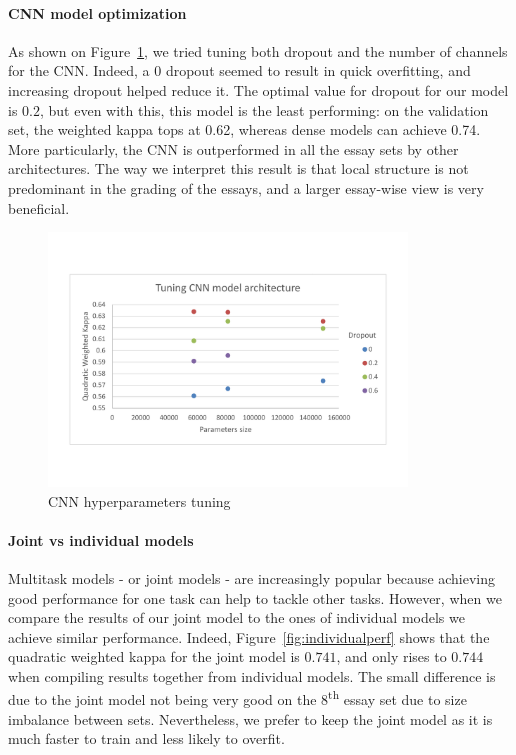 \documentclass[a4paper,12pt,english]{article}
\begin{document}
\paragraph{CNN model optimization}
As shown on Figure~\ref{fig:optcnn}, we tried tuning both dropout and the number of channels for the CNN. Indeed, a 0 dropout seemed to result in quick overfitting, and increasing dropout helped reduce it. The optimal value for dropout for our model is $0.2$, but even with this, this model is the least performing: on the validation set, the weighted kappa tops at 0.62, whereas dense models can achieve 0.74. More particularly, the CNN is outperformed in all the essay sets by other architectures. The way we interpret this result is that local structure is not predominant in the grading of the essays, and a larger essay-wise view is very beneficial.
\begin{figure}[h]
\vspace*{-1.5cm}
\centering
\includegraphics[width=0.85\textwidth]{fig/tune_cnn_arch.pdf}
\vspace*{-1.5cm}
\caption{CNN hyperparameters tuning}
\label{fig:optcnn}
\vspace*{-1cm}
\end{figure}


\paragraph{Joint vs individual models} Multitask models - or joint models - are increasingly popular because achieving good performance for one task can help to tackle other tasks. However, when we compare the results of our joint model to the ones of individual models we achieve similar performance. Indeed, Figure~\ref{fig:individualperf} shows that the quadratic weighted kappa for the joint model is $0.741$, and only rises to $0.744$ when compiling results together from individual models. The small difference is due to the joint model not being very good on the $8$\textsuperscript{th} essay set due to size imbalance between sets. Nevertheless, we prefer to keep the joint model as it is much faster to train and less likely to overfit.
\end{document}

